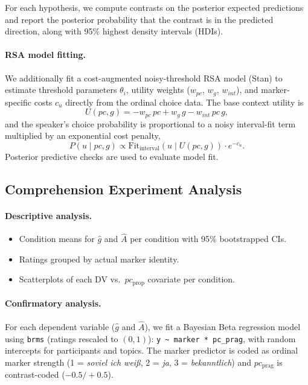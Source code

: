 \documentclass[12pt]{article}
\begin{document}
For each hypothesis, we compute contrasts on the posterior expected predictions and report the posterior probability that the contrast is in the predicted direction, along with 95\% highest density intervals (HDIs).

\paragraph{RSA model fitting.}
We additionally fit a cost-augmented noisy-threshold RSA model (Stan) to estimate threshold parameters $\theta_i$, utility weights ($w_{pc}$, $w_g$, $w_{int}$), and marker-specific costs $c_u$ directly from the ordinal choice data. The base context utility is
\begin{equation}
U(pc, g) = -w_{pc}\,pc + w_g\,g - w_{int}\,pc\,g,
\end{equation}
and the speaker's choice probability is proportional to a noisy interval-fit term multiplied by an exponential cost penalty,
\begin{equation}
P(u \mid pc, g) \propto \mathrm{Fit}_{\mathrm{interval}}(u \mid U(pc,g)) \cdot e^{-c_u}.
\end{equation}
Posterior predictive checks are used to evaluate model fit.

\subsection{Comprehension Experiment Analysis}
\label{sec:comp-analysis}

\paragraph{Descriptive analysis.}
\begin{itemize}
    \item Condition means for $\hat{g}$ and $\hat{A}$ per condition with 95\% bootstrapped CIs.
    \item Ratings grouped by actual marker identity.
    \item Scatterplots of each DV vs.\ $pc_{\text{prop}}$ covariate per condition.
\end{itemize}

\paragraph{Confirmatory analysis.}
For each dependent variable ($\hat{g}$ and $\hat{A}$), we fit a Bayesian Beta regression model using \texttt{brms} (ratings rescaled to $(0,1)$): \verb|y ~ marker * pc_prag|, with random intercepts for participants and topics. The marker predictor is coded as ordinal marker strength (1 = \textit{soviel ich wei\ss}, 2 = \textit{ja}, 3 = \textit{bekanntlich}) and $pc_{\text{prag}}$ is contrast-coded ($-0.5 / +0.5$).
\end{document}
